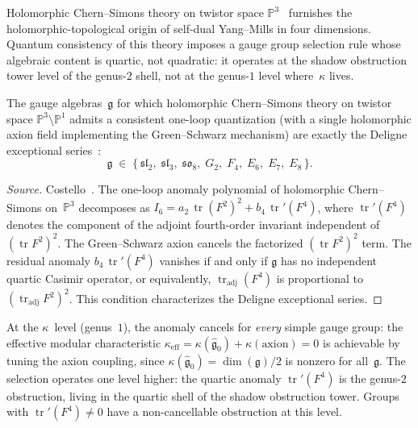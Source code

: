 Holomorphic Chern--Simons theory on twistor space
$\mathbb{P}^3$~\cite{Costello2111} furnishes the
holomorphic-topological origin of self-dual Yang--Mills in four
dimensions. Quantum consistency of this theory imposes a gauge
group selection rule whose algebraic content is quartic, not
quadratic: it operates at the shadow obstruction tower level of
the genus-$2$ shell, not at the genus-$1$ level where~$\kappa$
lives.

\begin{proposition}
\label{prop:ht-twistor-deligne}
The gauge algebras~$\mathfrak{g}$ for which holomorphic
Chern--Simons theory on twistor space
$\mathbb{P}^3 \setminus \mathbb{P}^1$ admits a consistent
one-loop quantization \textup{(}with a single holomorphic axion
field implementing the Green--Schwarz
mechanism\textup{)}
are exactly the Deligne exceptional
series~\cite{Deligne96, Cvitanovic08}:
\begin{equation}\label{eq:ht-deligne-series}
\mathfrak{g} \;\in\;
\bigl\{\,
 \mathfrak{sl}_2,\;
 \mathfrak{sl}_3,\;
 \mathfrak{so}_8,\;
 G_2,\;
 F_4,\;
 E_6,\;
 E_7,\;
 E_8
\,\bigr\}.
\end{equation}
\end{proposition}

\begin{proof}[Source]
Costello~\cite{Costello2111}.
The one-loop anomaly polynomial of holomorphic Chern--Simons
on~$\mathbb{P}^3$ decomposes as
$I_6 = a_2\,\operatorname{tr}(F^2)^2
+ b_4\,\operatorname{tr}'(F^4)$,
where $\operatorname{tr}'(F^4)$ denotes the component of the
adjoint fourth-order invariant independent of
$(\operatorname{tr} F^2)^2$.
The Green--Schwarz axion cancels the factorized
$(\operatorname{tr} F^2)^2$ term. The residual anomaly
$b_4\,\operatorname{tr}'(F^4)$ vanishes if and only if
$\mathfrak{g}$ has no independent quartic Casimir operator, or
equivalently,
$\operatorname{tr}_{\mathrm{adj}}(F^4)$ is proportional to
$(\operatorname{tr}_{\mathrm{adj}} F^2)^2$.
This condition characterizes the Deligne exceptional
series.
\end{proof}

\begin{remark}
\label{rem:ht-twistor-genus-level}
At the $\kappa$~level (genus~$1$), the anomaly cancels for
\emph{every} simple gauge group: the effective modular
characteristic
$\kappa_{\mathrm{eff}} = \kappa(\widehat{\mathfrak{g}}_0)
+ \kappa(\text{axion}) = 0$
is achievable by tuning the axion coupling, since
$\kappa(\widehat{\mathfrak{g}}_0) = \dim(\mathfrak{g})/2$
is nonzero for all~$\mathfrak{g}$.
The selection operates one level higher: the quartic
anomaly $\operatorname{tr}'(F^4)$ is the genus-$2$
obstruction, living in the quartic shell of the shadow
obstruction tower. Groups with
$\operatorname{tr}'(F^4) \neq 0$ have a non-cancellable
obstruction at this level.
\end{remark}

